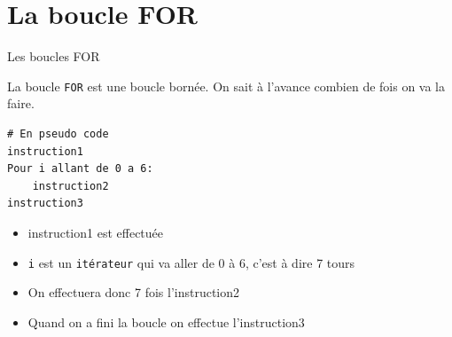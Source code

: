 \def\level{Première}  %
\def\course{NSI}
\def\chaptername{Boucles FOR et WHILE} %
\def\docname{LP04}        %

\pagestyle{cours_FP}
\makeheader{} %

\section{La boucle FOR}

\begin{easybox}{Les boucles FOR}{}

	La boucle \verb+FOR+ est une boucle bornée. On sait à l'avance combien de fois on va la faire.

\medskip

	\begin{minipage}{0.35\linewidth}
	\begin{lstlisting}[numbers=none]
# En pseudo code
instruction1
Pour i allant de 0 a 6:
	instruction2
instruction3
	\end{lstlisting}
		\end{minipage}\hfill
		\begin{minipage}{0.63\linewidth}
	\begin{itemize}
		\item instruction1 est effectuée
		\item \verb+i+ est un \verb+itérateur+ qui va aller de 0 à 6, c'est à dire 7 tours
		\item On effectuera donc 7 fois l'instruction2 
		\item Quand on a fini la boucle on effectue l'instruction3
	\end{itemize}
		\end{minipage}	
	\end{easybox}
	
